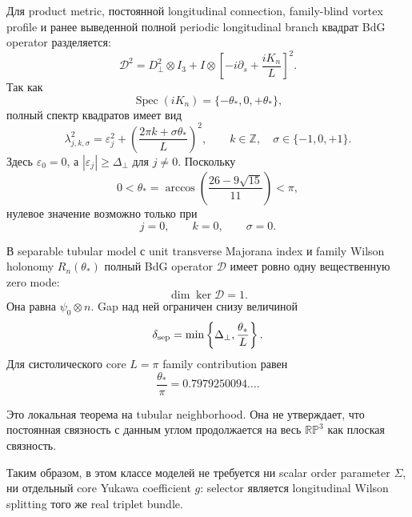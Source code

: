 Для product metric, постоянной longitudinal connection, family-blind
vortex profile и ранее выведенной полной periodic longitudinal branch
квадрат BdG operator разделяется:
\begin{equation}
 \mathcal D^2
 =D_\perp^2\otimes I_3+
 I\otimes\left[-i\partial_s+\frac{iK_n}{L}\right]^2.
\end{equation}
Так как
\begin{equation}
 \operatorname{Spec}(iK_n)=\{-\theta_*,0,+\theta_*\},
\end{equation}
полный спектр квадратов имеет вид
\begin{equation}
 \lambda_{j,k,\sigma}^2
 =\varepsilon_j^2+
 \left(\frac{2\pi k+\sigma\theta_*}{L}\right)^2,
 \qquad
 k\in\mathbb Z,
 \quad
 \sigma\in\{-1,0,+1\}.
\end{equation}
Здесь \(\varepsilon_0=0\), а \(|\varepsilon_j|\geq\Delta_\perp\) для
\(j\ne0\). Поскольку
\begin{equation}
 0<\theta_*=\arccos\!\left(\frac{26-9\sqrt{15}}{11}\right)<\pi,
\end{equation}
нулевое значение возможно только при
\begin{equation}
 j=0,
 \qquad k=0,
 \qquad \sigma=0.
\end{equation}

\begin{theorem}
В separable tubular model с unit transverse Majorana index и family Wilson
holonomy \(R_n(\theta_*)\) полный BdG operator \(\mathcal D\) имеет ровно одну вещественную
zero mode:
\begin{equation}
 \dim\ker\mathcal D=1.
\end{equation}
Она равна \(\psi_0\otimes n\). Gap над ней ограничен снизу величиной
\begin{equation}
 \delta_{\rm sep}
 =\min\left\{\Delta_\perp,\frac{\theta_*}{L}\right\}.
\end{equation}
Для систолического core \(L=\pi\) family contribution равен
\begin{equation}
 \frac{\theta_*}{\pi}=0.7979250094\ldots.
\end{equation}
\end{theorem}

Это локальная теорема на tubular neighborhood. Она не утверждает, что
постоянная связность с данным углом продолжается на весь
\(\mathbb{RP}^3\) как плоская связность.

Таким образом, в этом классе моделей не требуется ни scalar order parameter
\(\Sigma\), ни отдельный core Yukawa coefficient \(g\): selector является
longitudinal Wilson splitting того же real triplet bundle.

